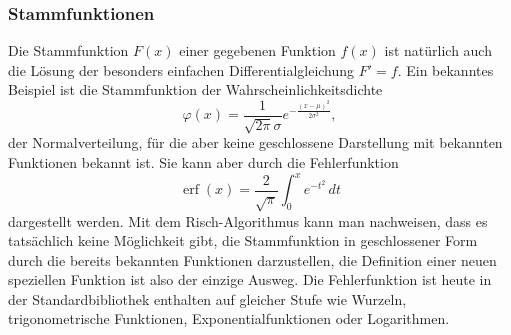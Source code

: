 %
%
\subsubsection{Stammfunktionen}
Die Stammfunktion $F(x)$ einer gegebenen Funktion $f(x)$ ist natürlich
auch die Lösung der besonders einfachen Differentialgleichung $F'=f$.
Ein bekanntes Beispiel ist die Stammfunktion der Wahrscheinlichkeitsdichte
\[
\varphi(x)
=
\frac{1}{\sqrt{2\pi}\sigma} e^{-\frac{(x-\mu)^2}{2\sigma^2}},
\]
der Normalverteilung, für die aber keine geschlossene Darstellung
mit bekannten Funktionen bekannt ist.
Sie kann aber durch die Fehlerfunktion
\[
\operatorname{erf}(x)
=
\frac{2}{\sqrt{\pi}} \int_0^x e^{-t^2}\,dt
\]
dargestellt werden.
Mit dem Risch-Algorithmus kann man nachweisen, dass es tatsächlich
keine Möglichkeit gibt, die Stammfunktion in geschlossener Form durch
die bereits bekannten Funktionen darzustellen, die Definition einer
neuen speziellen Funktion ist also der einzige Ausweg.
Die Fehlerfunktion ist heute in der Standardbibliothek enthalten auf
gleicher Stufe wie Wurzeln, trigonometrische Funktionen,
Exponentialfunktionen oder Logarithmen.

